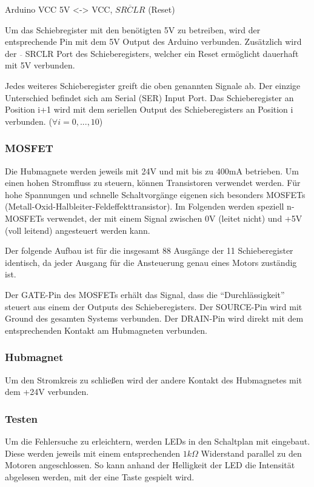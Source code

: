 Arduino VCC 5V <-> VCC, $\overline{SRCLR}$ (Reset)

Um das Schiebregister mit den benötigten 5V zu betreiben, wird der entsprechende Pin mit dem 5V Output des Arduino verbunden.
Zusätzlich wird der $\overline{ }$ SRCLR Port des Schieberegisters, welcher ein Reset ermöglicht dauerhaft mit 5V verbunden.

Jedes weiteres Schieberegister greift die oben genannten Signale ab.
Der einzige Unterschied befindet sich am Serial (SER) Input Port.
Das Schieberegister an Position i+1 wird mit dem seriellen Output des Schieberegisters an Position i verbunden. ($\forall i = 0,...,10$)

\subsubsection{MOSFET}

Die Hubmagnete werden jeweils mit 24V und mit bis zu 400mA betrieben.
Um einen hohen Stromfluss zu steuern, können Transistoren verwendet werden.
Für hohe Spannungen und schnelle Schaltvorgänge eigenen sich besonders MOSFETs (Metall-Oxid-Halbleiter-Feldeffekttransistor).
Im Folgenden werden speziell n-MOSFETs verwendet, der mit einem Signal zwischen 0V (leitet nicht) und +5V (voll leitend) angesteuert werden kann.

Der folgende Aufbau ist für die insgesamt 88 Ausgänge der 11 Schieberegister identisch, da jeder Ausgang für die Ansteuerung genau eines Motors zuständig ist.

Der GATE-Pin des MOSFETs erhält das Signal, dass die ``Durchlässigkeit'' steuert aus einem der Outputs des Schieberegisters.
Der SOURCE-Pin wird mit Ground des gesamten Systems verbunden.
Der DRAIN-Pin wird direkt mit dem entsprechenden Kontakt am Hubmagneten verbunden.

\subsubsection{Hubmagnet}

Um den Stromkreis zu schließen wird der andere Kontakt des Hubmagnetes mit dem +24V verbunden.

\subsubsection{Testen}

Um die Fehlersuche zu erleichtern, werden LEDs in den Schaltplan mit eingebaut.
Diese werden jeweils mit einem entsprechenden $1k\Omega$ Widerstand parallel zu den Motoren angeschlossen.
So kann anhand der Helligkeit der LED die Intensität abgelesen werden, mit der eine Taste gespielt wird.

